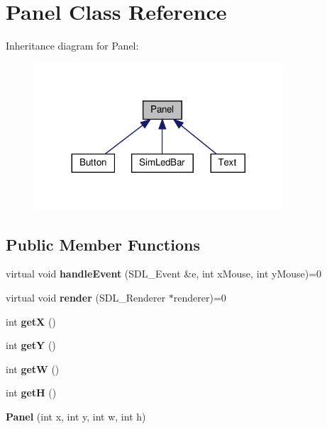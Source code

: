 \hypertarget{classPanel}{}\section{Panel Class Reference}
\label{classPanel}


Inheritance diagram for Panel\+:
\nopagebreak
\begin{figure}[H]
\begin{center}
\leavevmode
\includegraphics[width=263pt]{classPanel__inherit__graph}
\end{center}
\end{figure}
\subsection*{Public Member Functions}
\begin{DoxyCompactItemize}
\item 
\mbox{\label{classPanel_abc2ddb970ae3d0e94e61fb178abfcfa9}} 
virtual void {\bfseries handle\+Event} (S\+D\+L\+\_\+\+Event \&e, int x\+Mouse, int y\+Mouse)=0
\item 
\mbox{\label{classPanel_a7e82dc97db40a9c3fa8f6e4590e5b0b5}} 
virtual void {\bfseries render} (S\+D\+L\+\_\+\+Renderer $\ast$renderer)=0
\item 
\mbox{\label{classPanel_abf305e0f1520fa03eccf63e82c2be69d}} 
int {\bfseries getX} ()
\item 
\mbox{\label{classPanel_a04750870ef24802499bdaaaca4c0875d}} 
int {\bfseries getY} ()
\item 
\mbox{\label{classPanel_a332f6485d22e9f1cbe7d148dc52a2c0a}} 
int {\bfseries getW} ()
\item 
\mbox{\label{classPanel_a3232b7c6b3b73a7e2d203f827f2751d7}} 
int {\bfseries getH} ()
\item 
\mbox{\label{classPanel_a48215f39c37b7d890e47182ae1c2c2d6}} 
{\bfseries Panel} (int x, int y, int w, int h)
\end{DoxyCompactItemize}

